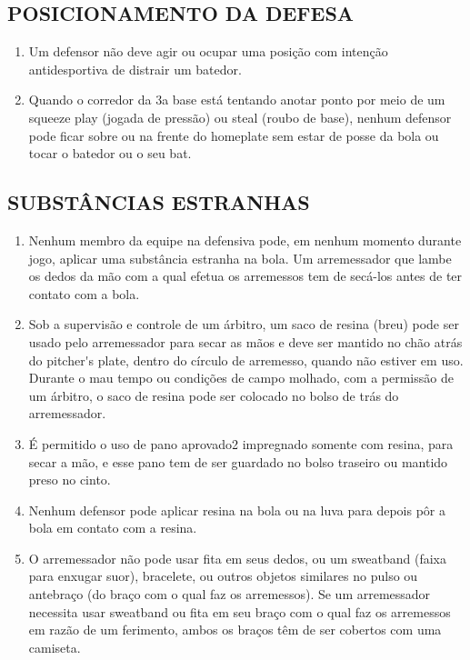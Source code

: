 \subsection{POSICIONAMENTO DA DEFESA}

\begin{enumerate}[label=(\alph*)]
	\item   Um defensor não deve agir ou ocupar uma posição com intenção antidesportiva de distrair um batedor.
	\item  Quando o corredor da 3a base está tentando anotar ponto por meio de um  \gls{squeeze play} (jogada de pressão) ou \gls{steal} (roubo de base), nenhum defensor  pode ficar sobre ou na frente do \gls{homeplate} sem estar de posse da bola ou tocar o batedor ou o seu \gls{bat}.
\end{enumerate}

\subsection{SUBSTÂNCIAS ESTRANHAS}
\begin{enumerate}[label=(\alph*)]
	\item   Nenhum membro da equipe na defensiva pode, em nenhum momento durante jogo, aplicar uma substância estranha na bola. Um arremessador que lambe os dedos da mão com a qual efetua os arremessos tem de secá-los antes de ter contato com a bola.
	\item  \begin{mdframed}[hidealllines=true,backgroundcolor=blue!20]
		Sob a supervisão e controle de um árbitro, um saco de resina (breu) pode ser usado pelo arremessador para secar as mãos e deve ser mantido no chão atrás do \gls{pitcher's plate}, dentro do círculo de arremesso, quando não estiver em uso. Durante o mau tempo ou condições de campo  molhado, com a permissão de um árbitro, o saco de resina pode ser colocado no bolso de trás do arremessador.
	\end{mdframed}
	\item  É permitido o uso de pano aprovado2 impregnado somente com resina, para secar a mão, e esse pano tem de ser guardado no bolso traseiro ou mantido preso no cinto.
	\item  Nenhum defensor pode aplicar resina na bola ou na luva para depois pôr a bola em contato com a resina.
	\item  O arremessador não pode usar fita em seus dedos, ou um \gls{sweatband} (faixa para enxugar suor), bracelete, ou outros objetos similares no pulso ou antebraço	(do braço com o qual faz os arremessos). Se um arremessador necessita usar \gls{sweatband} ou fita em seu braço com o qual faz os arremessos em razão de um ferimento, ambos os braços têm de ser cobertos com uma camiseta.
\end{enumerate}

